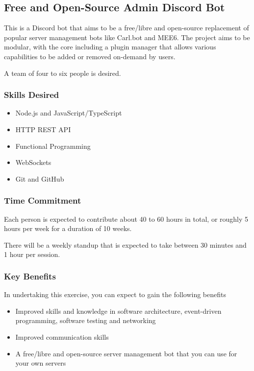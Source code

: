 \documentclass[../proposal-for-projects-2025.tex]{subfiles}
\begin{document}
\subsection{Free and Open-Source Admin Discord Bot}

This is a Discord bot that aims to be a free/libre and open-source replacement of popular server management bots like Carl.bot and MEE6.  The project aims to be modular, with the core including a plugin manager that allows various capabilities to be added or removed on-demand by users.

A team of four to six people is desired.

\subsubsection*{Skills Desired}

\begin{multicols}{2}
\begin{itemize}
    \item Node.js and JavaScript/TypeScript
    \item HTTP REST API
    \item Functional Programming
    \item WebSockets
    \item Git and GitHub
\end{itemize}
\end{multicols}

\subsubsection*{Time Commitment}

Each person is expected to contribute about 40 to 60 hours in total, or roughly 5 hours per week for a duration of 10 weeks.

There will be a weekly standup that is expected to take between 30 minutes and 1 hour per session.

\subsubsection*{Key Benefits}

In undertaking this exercise, you can expect to gain the following benefits

\begin{itemize}
    \item Improved skills and knowledge in software architecture, event-driven programming, software testing and networking
    \item Improved communication skills
    \item A free/libre and open-source server management bot that you can use for your own servers
\end{itemize}
\end{document}

